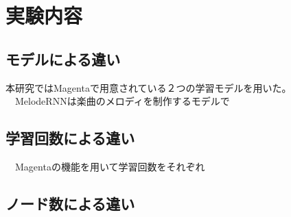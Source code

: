 \chapter{実験内容}
\section{モデルによる違い}
本研究ではMagentaで用意されている２つの学習モデルを用いた。
　MelodeRNNは楽曲のメロディを制作するモデルで
\section{学習回数による違い}

　Magentaの機能を用いて学習回数をそれぞれ
\section{ノード数による違い}

